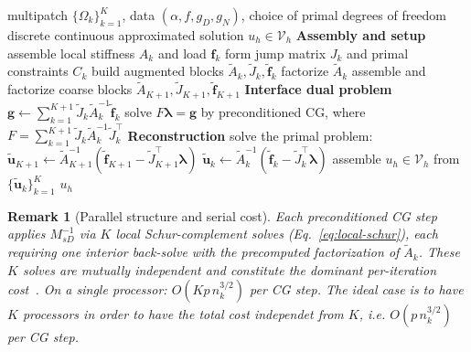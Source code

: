 \documentclass{article}
\newcommand{\vect}[1]{\boldsymbol{#1}}
\newcommand{\npatch}{K} %
\newcommand{\patchdom}[1]{\Omega_{#1}}            %
\newcommand{\Vglo}{\mathcal{V}_h}                  %
\newcommand{\Aloc}[1]{A_{#1}}                    %
\newcommand{\Aaug}[1]{\widetilde{A}_{#1}}        %
\newcommand{\floc}[1]{\vect{f}_{#1}}             %
\newcommand{\faug}[1]{\widetilde{\vect{f}}_{#1}} %
\newcommand{\Jloc}[1]{J_{#1}}                    %
\newcommand{\Jaug}[1]{\widetilde{J}_{#1}}        %
\newcommand{\Cloc}[1]{C_{#1}}                    %
\newcommand{\Fschur}{F}                           %
\newcommand{\gschur}{\vect{g}}                    %
\newcommand{\Psd}{M_{sD}^{-1}}                   %
\newcommand{\uaug}[1]{\widetilde{\vect{u}}_{#1}} %
\newcommand{\lagmult}{\vect{\lambda}}             %
\theoremstyle{plain}
\newtheorem{rmk}{Remark}
\numberwithin{equation}{section}
\begin{document}
\begin{algorithm}[t]
    \caption{IETI-DP solver for the model problem~\eqref{eq:poisson-strong}.}
    \label{alg:ieti-dp}
    \begin{algorithmic}[1]
        \Require multipatch $\{\patchdom{k}\}_{k=1}^{\npatch}$, data $(\alpha, f, g_D, g_N)$,
        choice of primal degrees of freedom
        \Ensure  discrete continuous approximated solution $u_h \in \Vglo$
        \vspace{0.2cm}
        \Statex \textbf{Assembly and setup}
        \ParFor{k = 1, \dots, \npatch} 
        \State assemble local stiffness $\Aloc{k}$ and load $\floc{k}$
        \State form jump matrix $\Jloc{k}$ and primal constraints $\Cloc{k}$
        \State build augmented blocks $\Aaug{k}, \Jaug{k},
            \faug{k}$ 
        \State factorize $\Aaug{k}$ 
        \EndParFor
        \State assemble and factorize coarse blocks $\Aaug{\npatch+1},
            \Jaug{\npatch+1}, \faug{\npatch+1}$ 
        \vspace{0.2cm}
        \Statex \textbf{Interface dual problem}
        \State $\gschur \gets \sum_{k=1}^{\npatch+1} \Jaug{k}
            \Aaug{k}^{-1} \faug{k}$ 
        \State solve $\Fschur \lagmult = \gschur$ by preconditioned CG, where $\Fschur = \sum_{k=1}^{\npatch+1} \Jaug{k} \Aaug{k}^{-1} \Jaug{k}^{\top}$
        \vspace{0.2cm}
        \Statex \textbf{Reconstruction}
        \State solve the primal problem:
        $\uaug{\npatch+1} \gets \Aaug{\npatch+1}^{-1}
            (\faug{\npatch+1} - \Jaug{\npatch+1}^{\top} \lagmult)$ 
        \ParFor{k = 1, \dots, \npatch} 
        \State $\uaug{k} \gets \Aaug{k}^{-1}
            (\faug{k} - \Jaug{k}^{\top} \lagmult)$
        \EndParFor
        \State assemble $u_h \in \Vglo$ from $\{\uaug{k}\}_{k=1}^{\npatch}$
        \State \Return $u_h$
    \end{algorithmic}
\end{algorithm}

\begin{rmk}[Parallel structure and serial cost] \label{rmk:schur-cost}
    Each preconditioned CG step applies $\Psd$ via $K$ local Schur-complement
    solves (Eq.~\eqref{eq:local-schur}), each requiring one interior back-solve
    with the precomputed factorization of $\Aaug{k}$.
    These $K$ solves are mutually independent and constitute the dominant
    per-iteration cost~\cite[\S4.5]{kleiss2012ieti}.
    On a single processor: $O(K p\,n_k^{3/2})$ per CG step.
    The ideal case is to have $K$ processors in order to have the
    total cost independet from $K$, i.e. $O(p\,n_k^{3/2})$ per CG step.
\end{rmk}
\end{document}
